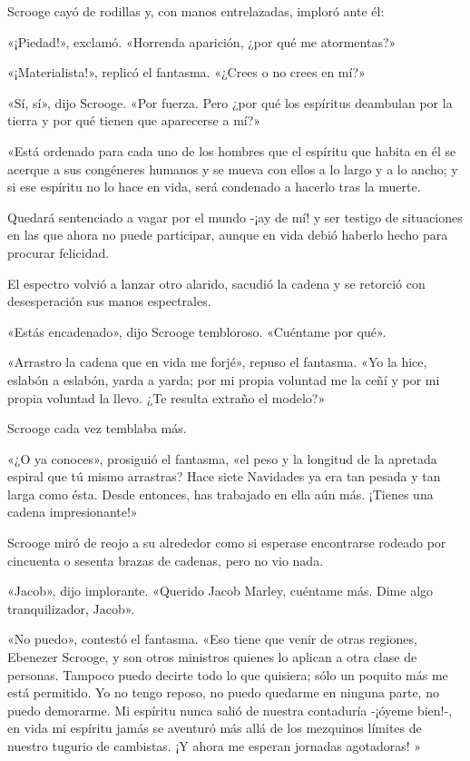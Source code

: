 \documentclass{novela}
\begin{document}
 Scrooge cayó de rodillas y, con manos entrelazadas, imploró ante él:

 «¡Piedad!», exclamó. «Horrenda aparición, ¿por qué me atormentas?»

 «¡Materialista!», replicó el fantasma. «¿Crees o no crees en mí?»

 «Sí, sí», dijo Scrooge. «Por fuerza. Pero ¿por qué los espíritus deambulan por la tierra y por qué tienen que aparecerse a mí?»

 «Está ordenado para cada uno de los hombres que el espíritu que habita en él se acerque a sus congéneres humanos y se mueva con ellos a lo largo y a lo ancho; y si ese espíritu no lo hace en vida, será condenado a hacerlo tras la muerte.

 Quedará sentenciado a vagar por el mundo -¡ay de mí! y ser testigo de situaciones en las que ahora no puede participar, aunque en vida debió haberlo hecho para procurar felicidad.

 El espectro volvió a lanzar otro alarido, sacudió la cadena y se retorció con desesperación sus manos espectrales.

 «Estás encadenado», dijo Scrooge tembloroso. «Cuéntame por qué».

 «Arrastro la cadena que en vida me forjé», repuso el fantasma. «Yo la hice, eslabón a eslabón, yarda a yarda; por mi propia voluntad me la ceñí y por mi propia voluntad la llevo. ¿Te resulta extraño el modelo?»

 Scrooge cada vez temblaba más.

 «¿O ya conoces», prosiguió el fantasma, «el peso y la longitud de la apretada espiral que tú mismo arrastras? Hace siete Navidades ya era tan pesada y tan larga como ésta. Desde entonces, has trabajado en ella aún más. ¡Tienes una cadena impresionante!»

 Scrooge miró de reojo a su alrededor como si esperase encontrarse rodeado por cincuenta o sesenta brazas de cadenas, pero no vio nada.

 «Jacob», dijo implorante. «Querido Jacob Marley, cuéntame más. Dime algo tranquilizador, Jacob».

 «No puedo», contestó el fantasma. «Eso tiene que venir de otras regiones, Ebenezer Scrooge, y son otros ministros quienes lo aplican a otra clase de personas. Tampoco puedo decirte todo lo que quisiera; sólo un poquito más me está permitido. Yo no tengo reposo, no puedo quedarme en ninguna parte, no puedo demorarme. Mi espíritu nunca salió de nuestra contaduría -¡óyeme bien!-, en vida mi espíritu jamás se aventuró más allá de los mezquinos límites de nuestro tugurio de cambistas. ¡Y ahora me esperan jornadas agotadoras! »
\end{document}

